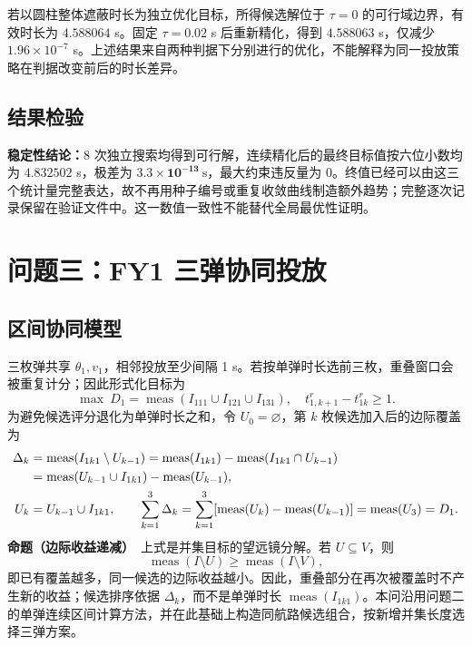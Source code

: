 \documentclass[UTF8,a4paper,12pt,fontset=windows]{ctexart}
\newcommand{\meas}{\operatorname{meas}}
\begin{document}
若以圆柱整体遮蔽时长为独立优化目标，所得候选解位于 $\tau=0$ 的可行域边界，有效时长为 $4.588064$ s。固定 $\tau=0.02$ s 后重新精化，得到 $4.588063$ s，仅减少 $1.96\times10^{-7}$ s。上述结果来自两种判据下分别进行的优化，不能解释为同一投放策略在判据改变前后的时长差异。

\subsection{结果检验}

\textbf{稳定性结论：}8 次独立搜索均得到可行解，连续精化后的最终目标值按六位小数均为 $4.832502$ s，极差为 $\bm{3.3\times10^{-13}\ \mathrm{s}}$，最大约束违反量为 0。终值已经可以由这三个统计量完整表达，故不再用种子编号或重复收敛曲线制造额外趋势；完整逐次记录保留在验证文件中。这一数值一致性不能替代全局最优性证明。

\section{问题三：FY1 三弹协同投放}

\subsection{区间协同模型}

三枚弹共享 $\theta_1,v_1$，相邻投放至少间隔 1 s。若按单弹时长选前三枚，重叠窗口会被重复计分；因此形式化目标为
\begin{equation}
\max\ D_1=\meas(I_{111}\cup I_{121}\cup I_{131}),
\quad t_{1,k+1}^r-t_{1k}^r\geq1.
\label{eq:q3-model}
\end{equation}
为避免候选评分退化为单弹时长之和，令 $U_0=\varnothing$，第 $k$ 枚候选加入后的边际覆盖为
\begin{align}
\Delta_k&=\meas(I_{1k1}\setminus U_{k-1})
=\meas(I_{1k1})-\meas(I_{1k1}\cap U_{k-1})\notag\\
&=\meas(U_{k-1}\cup I_{1k1})-\meas(U_{k-1}),\label{eq:q3-marginal}\\
U_k&=U_{k-1}\cup I_{1k1},\qquad
\sum_{k=1}^{3}\Delta_k
=\sum_{k=1}^{3}[\meas(U_k)-\meas(U_{k-1})]
=\meas(U_3)=D_1.
\end{align}
\noindent\textbf{命题（边际收益递减）}　上式是并集目标的望远镜分解。若 $U\subseteq V$，则
\begin{equation}
\meas(I\setminus U)\geq\meas(I\setminus V),
\label{eq:diminishing-return}
\end{equation}
即已有覆盖越多，同一候选的边际收益越小。因此，重叠部分在再次被覆盖时不产生新的收益；候选排序依据 $\Delta_k$，而不是单弹时长 $\meas(I_{1k1})$。本问沿用问题二的单弹连续区间计算方法，并在此基础上构造同航路候选组合，按新增并集长度选择三弹方案。
\end{document}
